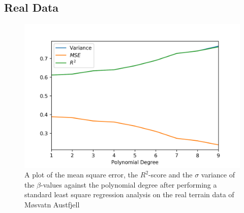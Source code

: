 \documentclass[a4paper,10pt,english]{article}
\begin{document}
%






\subsection{Real Data}



\begin{figure}[H]
	\centering 
	\includegraphics[scale=0.7]{../real_output/part_A.png}
	\caption{
		A plot of the mean square error, the $R^2$-score and the $\sigma$ variance of the $\beta$-values against the polynomial degree after performing a standard least square regression analysis on the real terrain data of Møsvatn Austfjell
	}
	\label{part_g_a}
\end{figure}
\end{document}
